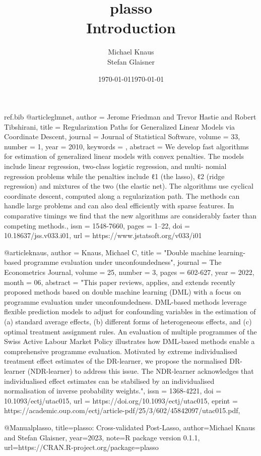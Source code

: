 \documentclass[12pt]{article}
\title{\vspace{-2cm} plasso \\ Introduction}
\author{Michael Knaus \\ Stefan Glaisner}
\date{\today}
\date{\today}
\begin{document}
\begin{filecontents}{ref.bib}
@article{glmnet,
   author = {Jerome Friedman and Trevor Hastie and Robert Tibshirani},
   title = {Regularization Paths for Generalized Linear Models via Coordinate Descent},
   journal = {Journal of Statistical Software},
   volume = {33},
   number = {1},
   year = {2010},
   keywords = {},
   abstract = {We develop fast algorithms for estimation of generalized linear models with convex penalties. The models include linear regression, two-class logistic regression, and multi- nomial regression problems while the penalties include ℓ1 (the lasso), ℓ2 (ridge regression) and mixtures of the two (the elastic net). The algorithms use cyclical coordinate descent, computed along a regularization path. The methods can handle large problems and can also deal efficiently with sparse features. In comparative timings we find that the new algorithms are considerably faster than competing methods.},
   issn = {1548-7660},
   pages = {1--22},
   doi = {10.18637/jss.v033.i01},
   url = {https://www.jstatsoft.org/v033/i01}
}

@article{knaus,
    author = {Knaus, Michael C},
    title = "{Double machine learning-based programme evaluation under unconfoundedness}",
    journal = {The Econometrics Journal},
    volume = {25},
    number = {3},
    pages = {602-627},
    year = {2022},
    month = {06},
    abstract = "{This paper reviews, applies, and extends recently proposed methods based on double machine learning (DML) with a focus on programme evaluation under unconfoundedness. DML-based methods leverage flexible prediction models to adjust for confounding variables in the estimation of (a) standard average effects, (b) different forms of heterogeneous effects, and (c) optimal treatment assignment rules. An evaluation of multiple programmes of the Swiss Active Labour Market Policy illustrates how DML-based methods enable a comprehensive programme evaluation. Motivated by extreme individualised treatment effect estimates of the DR-learner, we propose the normalised DR-learner (NDR-learner) to address this issue. The NDR-learner acknowledges that individualised effect estimates can be stabilised by an individualised normalisation of inverse probability weights.}",
    issn = {1368-4221},
    doi = {10.1093/ectj/utac015},
    url = {https://doi.org/10.1093/ectj/utac015},
    eprint = {https://academic.oup.com/ectj/article-pdf/25/3/602/45842097/utac015.pdf},
}

@Manual{plasso,
  title={plasso: Cross-validated Post-Lasso},
  author={Michael Knaus and Stefan Glaisner},
  year={2023},
  note={R package version 0.1.1},
  url={https://CRAN.R-project.org/package=plasso}
}
\end{filecontents}
\end{document}
